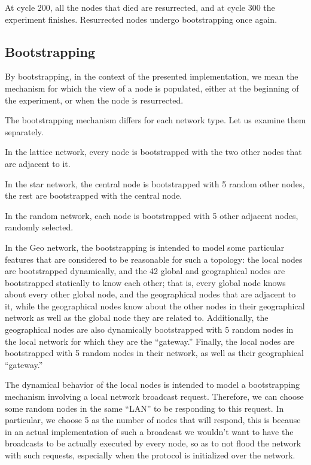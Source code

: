 \documentclass[a4paper]{ifacconf}
\begin{document}
At cycle 200, all the nodes that died are resurrected, and at cycle 300 the experiment finishes.
Resurrected nodes undergo bootstrapping once again.

\subsection{Bootstrapping}

By bootstrapping, in the context of the presented implementation, we mean the mechanism for which the view of a node is populated, either at the beginning of the experiment, or when the node is resurrected.

The bootstrapping mechanism differs for each network type.
Let us examine them separately.

In the lattice network, every node is bootstrapped with the two other nodes that are adjacent to it.

In the star network, the central node is bootstrapped with 5 random other nodes, the rest are bootstrapped with the central node.

In the random network, each node is bootstrapped with 5 other adjacent nodes, randomly selected.

In the Geo network, the bootstrapping is intended to model some particular features that are considered to be reasonable for such a topology: the local nodes are bootstrapped dynamically, and the 42 global and geographical nodes are bootstrapped statically to know each other; that is, every global node knows about every other global node, and the geographical nodes that are adjacent to it, while the geographical nodes know about the other nodes in their geographical network as well as the global node they are related to.
Additionally, the geographical nodes are also dynamically bootstrapped with 5 random nodes in the local network for which they are the ``gateway.''
Finally, the local nodes are bootstrapped with 5 random nodes in their network, as well as their geographical ``gateway.''

The dynamical behavior of the local nodes is intended to model a bootstrapping mechanism involving a local network broadcast request.
Therefore, we can choose some random nodes in the same ``LAN'' to be responding to this request.
In particular, we choose 5 as the number of nodes that will respond, this is because in an actual implementation of such a broadcast we wouldn't want to have the broadcasts to be actually executed by every node, so as to not flood the network with such requests, especially when the protocol is initialized over the network.
\end{document}
